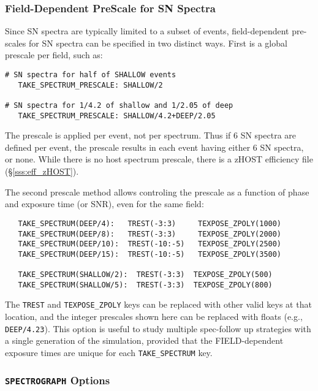 \documentclass[12pt]{article}
\newcommand{\SPEC}{{\tt SPECTROGRAPH}}
\begin{document}
\clearpage
\subsubsection{Field-Dependent PreScale for SN Spectra}
\label{sss:SPEC_PRESCALE}

Since SN spectra are typically limited to a subset of events,
field-dependent pre-scales for SN spectra can be specified in 
two distinct ways. First is a global prescale per field, such as:
%
\begin{verbatim}
# SN spectra for half of SHALLOW events
   TAKE_SPECTRUM_PRESCALE: SHALLOW/2  

# SN spectra for 1/4.2 of shallow and 1/2.05 of deep
   TAKE_SPECTRUM_PRESCALE: SHALLOW/4.2+DEEP/2.05
\end{verbatim}
The prescale is applied per event, not per spectrum.
Thus if 6 SN spectra are defined per event, the prescale
results in each event having either 6 SN spectra, or none.
While there is no host spectrum prescale,
there is a zHOST efficiency file (\S\ref{sss:eff_zHOST}).

The second prescale method allows controling the prescale as
a function of phase and exposure time (or SNR), even for the
same field:
\begin{verbatim} 
   TAKE_SPECTRUM(DEEP/4):   TREST(-3:3)     TEXPOSE_ZPOLY(1000)
   TAKE_SPECTRUM(DEEP/8):   TREST(-3:3)     TEXPOSE_ZPOLY(2000)
   TAKE_SPECTRUM(DEEP/10):  TREST(-10:-5)   TEXPOSE_ZPOLY(2500)
   TAKE_SPECTRUM(DEEP/15):  TREST(-10:-5)   TEXPOSE_ZPOLY(3500)

   TAKE_SPECTRUM(SHALLOW/2):  TREST(-3:3)  TEXPOSE_ZPOLY(500)
   TAKE_SPECTRUM(SHALLOW/5):  TREST(-3:3)  TEXPOSE_ZPOLY(800)
\end{verbatim}
%
The {\tt TREST} and {\tt TEXPOSE\_ZPOLY} keys can be replaced
with other valid keys at that location, and the integer prescales
shown here can be replaced with floats (e.g., {\tt DEEP/4.23}).
This option is useful to study multiple spec-follow up strategies 
with a single generation of the simulation, provided that the
FIELD-dependent exposure times are unique for each 
{\tt TAKE\_SPECTRUM} key.

\subsubsection{{\SPEC} Options}
\label{sss:SPEC_OPTMASK}
\end{document}
